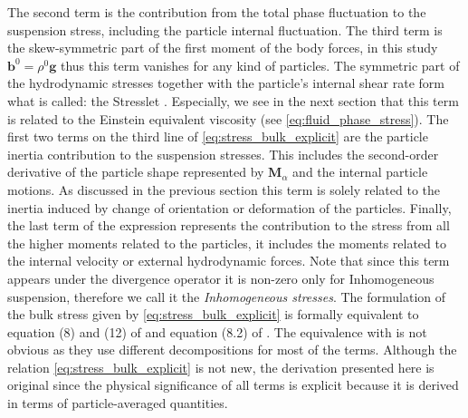 The second term is the  contribution from the total phase fluctuation to the suspension stress, including the particle internal fluctuation. 
The third term is the skew-symmetric part of the first moment of the body forces, in this study $\textbf{b}^0 = \rho^0 \textbf{g}$ thus this term vanishes for any kind of particles. 
The symmetric part of the hydrodynamic stresses together with the particle's internal shear rate form what is called: the Stresslet \citep{pozrikidis1992boundary}. 
Especially, we see in the next section that this term is related to the Einstein equivalent viscosity (see \ref{eq:fluid_phase_stress}). 
The first two terms on the third line of \ref{eq:stress_bulk_explicit} are the particle inertia contribution to the suspension stresses. 
This includes the second-order derivative of the particle shape represented by $\textbf{M}_\alpha$ and the internal particle motions. 
As discussed in the previous section this term is solely related to the inertia induced by change of orientation or deformation of the particles. 
Finally, the last term of the expression represents the contribution to the stress from all the higher moments related to the particles, it includes the moments related to the internal velocity or external hydrodynamic forces.  
Note that since this term appears under the divergence operator it is non-zero only for Inhomogeneous suspension, therefore we call it the \textit{Inhomogeneous stresses}. 
The formulation of the bulk stress given by \ref{eq:stress_bulk_explicit} is formally equivalent to equation (8) and (12) of \citet{lhuillier1996contribution} and equation (8.2) of \citet{zhang1997momentum}.
The equivalence with \citet{zhang1997momentum} is not obvious as they use different decompositions for most of the terms. 
Although the relation \ref{eq:stress_bulk_explicit} is not new, the derivation presented here is original since the physical significance of all terms is explicit because it is derived in terms of particle-averaged quantities.

    



